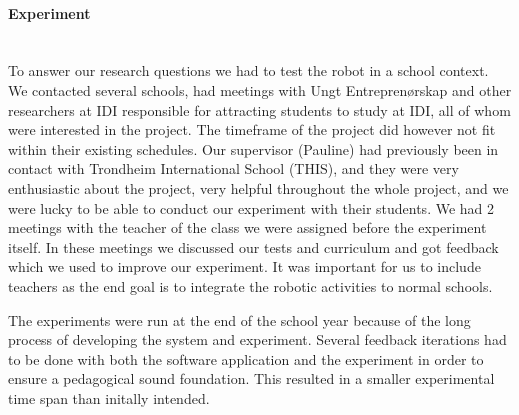 \paragraph{Experiment}~\\
To answer our research questions we had to test the robot in a school context. We contacted several schools, had meetings with Ungt Entreprenørskap and other researchers at IDI responsible for attracting students to study at IDI, all of whom were interested in the project. The timeframe of the project did however not fit within their existing schedules. Our supervisor (Pauline) had previously been in contact with Trondheim International School (THIS), and they were very enthusiastic about the project, very helpful throughout the whole project, and we were lucky to be able to conduct our experiment with their students. 
We had 2 meetings with the teacher of the class we were assigned before the experiment itself. In these meetings we discussed our tests and curriculum and got feedback which we used to improve our experiment. It was important for us to include teachers as the end goal is to integrate the robotic activities to normal schools.

\bigskip\noindent
The experiments were run at the end of the school year because of the long process of developing the system and experiment. Several feedback iterations had to be done with both the software application and the experiment in order to ensure a pedagogical sound foundation. 
This resulted in a smaller experimental time span than initally intended.